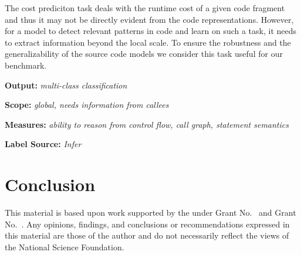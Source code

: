 \documentclass[sigplan,review,anonymous]{acmart}\settopmatter{printfolios=true,printccs=false,printacmref=false}
\begin{document}
The cost prediciton task deals with the runtime cost of a given code fragment and thus it may not be directly evident from the code representations. However, for a model to detect relevant patterns in code and learn on such a task, it needs to extract information beyond the local scale. To ensure the robustness and the generalizability of the source code models we consider this task useful for our benchmark. \newline

\noindent
\textbf{Output:} \textit{multi-class classification}

\noindent
\textbf{Scope:} \textit{global, needs information from callees}

\noindent
\textbf{Measures:} \textit{ability to reason from control flow, call graph, statement semantics}

\noindent
\textbf{Label Source:} \textit{Infer}





\section{Conclusion}




\begin{acks}                            %
  This material is based upon work supported by the 
   under Grant
  No.~ and Grant
  No.~.  Any opinions, findings, and
  conclusions or recommendations expressed in this material are those
  of the author and do not necessarily reflect the views of the
  National Science Foundation.
\end{acks}
\end{document}
